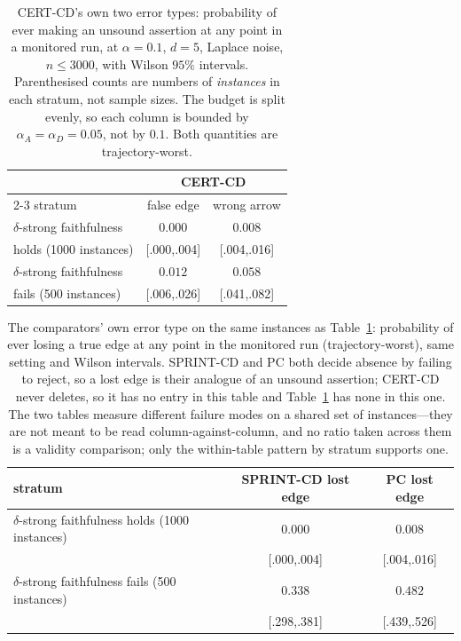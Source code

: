 \begin{table}[t]
\centering
\caption{CERT-CD's own two error types: probability of ever making an unsound
assertion at any point in a monitored run, at $\alpha = 0.1$, $d = 5$, Laplace
noise, $n \le 3000$, with Wilson $95\%$ intervals. Parenthesised counts are
numbers of \emph{instances} in each stratum, not sample sizes. The budget is
split evenly, so each column is bounded by $\alpha_A = \alpha_D = 0.05$, not by
$0.1$. Both quantities are trajectory-worst.}\label{tab:main}
\footnotesize
\begin{tabular}{@{}lcc@{}}
\toprule
& \multicolumn{2}{c}{CERT-CD} \\
\cmidrule(lr){2-3}
stratum & false edge & wrong arrow \\
\midrule
$\delta$-strong faithfulness       & $0.000$          & $0.008$ \\
holds (1000 instances)             & \tiny{[.000,.004]} & \tiny{[.004,.016]} \\[3pt]
$\delta$-strong faithfulness       & $0.012$          & $\mathbf{0.058}$ \\
fails (500 instances)              & \tiny{[.006,.026]} & \tiny{[.041,.082]} \\
\bottomrule
\end{tabular}
\end{table}

\begin{table}[t]
\centering
\caption{The comparators' own error type on the same instances as
Table~\ref{tab:main}: probability of ever losing a true edge at any point in
the monitored run (trajectory-worst), same setting and Wilson intervals.
SPRINT-CD and PC both decide absence by failing to reject, so a lost edge is
their analogue of an unsound assertion; CERT-CD never deletes, so it has no
entry in this table and Table~\ref{tab:main} has none in this one. The two
tables measure different failure modes on a shared set of instances---they
are not meant to be read column-against-column, and no ratio taken across
them is a validity comparison; only the within-table pattern by stratum
supports one.}\label{tab:main-comparators}
\footnotesize
\begin{tabular}{@{}lcc@{}}
\toprule
stratum & SPRINT-CD lost edge & PC lost edge \\
\midrule
$\delta$-strong faithfulness holds (1000 instances) & $0.000$ & $0.008$ \\
                                                    & \tiny{[.000,.004]} & \tiny{[.004,.016]} \\[3pt]
$\delta$-strong faithfulness fails (500 instances) & $0.338$ & $0.482$ \\
                                                    & \tiny{[.298,.381]} & \tiny{[.439,.526]} \\
\bottomrule
\end{tabular}
\end{table}
